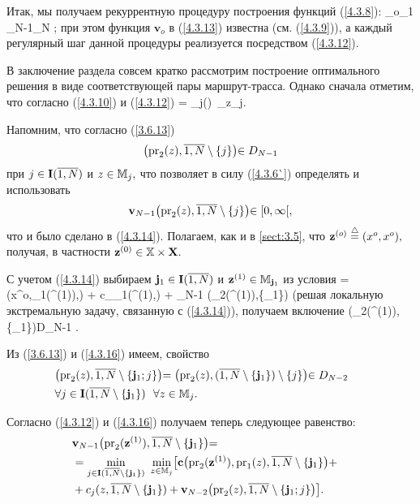Итак, мы получаем рекуррентную процедуру построения функций (\ref{4.3.8}):
\bfn
  \label{4.3.13}
  _o\longrightarrow  {}_1\longrightarrow\cdots
  \longrightarrow {}_{N-1}\longrightarrow {}_N
  ;
\efn
при этом функция
$\mathbf{v}_o$ в (\ref{4.3.13}) известна
(см. (\ref{4.3.9})),
а каждый регулярный шаг данной процедуры реализуется посредством
(\ref{4.3.12}).

В заключение раздела совсем кратко рассмотрим построение оптимального
решения в виде соответствующей пары маршрут-трасса.
Однако сначала отметим,
что согласно (\ref{4.3.10}) и (\ref{4.3.12})
\bfn
  \label{4.3.14}
   = \min\limits_{j\in {}()}\
  \min\limits_{z\in\bbm_j}\bigl[\mathbf{c}\bigl(x^o,\mathrm{pr}_1(z),\ov{1,N}\bigl) +
  c_j(z,\ov{1,N}) + \mathbf{v}_{N-1}\bigl(\mathrm{pr}_2(z),\ov{1,N}\sm\{j\}\bigl)\bigl]
  .
\efn

Напомним, что согласно (\ref{3.6.13})
$$
  \bigl(\mathrm{pr}_2(z),\ov{1,N}\sm\{j\}\bigl)\in D_{N-1}
$$
при
$j\in\mathbf{I}(\ov{1,N})$ и $z\in{\mathbb M}_j,$
что позволяет в силу
(\ref{4.3.6`}) определять и использовать
$$
  \mathbf{v}_{N-1}\bigl(\mathrm{pr}_2(z),\ov{1,N}\sm\{j\}\bigl)\in[0,\infty[
  ,
$$
что и было сделано в (\ref{4.3.14}).
Полагаем, как и в \ref{sect:3.5}, что
$\mathbf{z}^{(o)}\stackrel{\triangle}{=} (x^o,x^o),$
получая, в частности
$\mathbf{z}^{(0)}\in {\mathbb X}\times \mathbf{X}.$

С учетом (\ref{4.3.14})
выбираем
$\mathbf{j}_1\in \mathbf{I}(\ov{1,N})$ и
$\mathbf{z}^{(1)}\in \bbm_{_1}$
из условия
\bfn
  \label{4.3.15}
  = \bigl(x^o,_1(^{(1)}),\bigl) +
  c_{_1}(^{(1)},) + \mathbf{v}_{N-1}
  \bigl(\mathrm{pr}_2(\mathbf{z}^{(1)}),\ov{1,N}\sm\{\mathbf{j}_1\}\bigl)
\efn
(решая локальную экстремальную задачу, связанную с (\ref{4.3.14})),
получаем включение
\bfn
  \label{4.3.16}
  \bigl(_2(^{(1)}),\sm\{_1\}\bigl)\in D_{N-1}
  .
\efn

Из (\ref{3.6.13}) и (\ref{4.3.16})
имеем, свойство
\begin{eqnarray}
  &\bigl(\mathrm{pr}_2(z),\ov{1,N}\sm\{\mathbf{j}_1;j\}\bigl) =
  \bigl(\mathrm{pr}_2(z),(\ov{1,N}\sm
  \{\mathbf{j}_1\})\sm\{j\}\bigl)\in D_{N-2}\ \
  &\nonumber\\
  &\fa j\in
  \mathbf{I}(\ov{1,N}\sm\{\mathbf{j}_1\})\
  \ \fa z\in \bbm_j
  .
\end{eqnarray}

Согласно (\ref{4.3.12}) и (\ref{4.3.16})
получаем теперь следующее равенство:
\begin{eqnarray}
  &\mathbf{v}_{N-1}\bigl(\mathrm{pr}_2(\mathbf{z}^{(1)}),\ov{1,N}\sm\{\mathbf{j}_1\}
  \bigl)=
  &\nonumber\\
  &=\min\limits_{j\in\mathbf{I}(\ov{1,N}\sm\{\mathbf{j}_1\})}\
  \min\limits_{z\in\bbm_j}\bigl[\mathbf{c}\bigl(\mathrm{pr}_2(\mathbf{z}^{(1)}),\mathrm{pr}_1(z),
  \ov{1,N}\sm \{\mathbf{j}_1\}\bigl) +
  &\nonumber\\
  &+ c_j(z,\ov{1,N}\sm\{\mathbf{j}_1\}) +
  \mathbf{v}_{N-2}\bigl(\mathrm{pr}_2(z),\ov{1,N}\sm\{\mathbf{j}_1;j\}\bigl)\bigl]
  .
  &
  \label{4.3.17}
\end{eqnarray}


